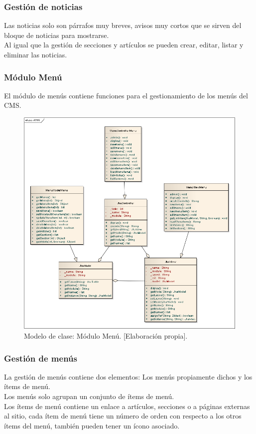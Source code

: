 \subsubsection{Gesti\'on de noticias}
Las noticias solo son p\'arrafos muy breves, avisos muy cortos que se sirven del bloque de noticias para mostrarse.\\
Al igual que la gesti\'on de secciones y art\'iculos se pueden crear, editar, listar y eliminar las noticias.

\newpage
\subsubsection{M\'odulo Men\'u}
El m\'odulo de men\'us contiene funciones para el gestionamiento de los men\'us del CMS.

\begin{figure}[h]
\centering
\includegraphics[scale=.4, keepaspectratio=true]{imagenes/15_imagen.png}
\caption{Modelo de clase: M\'odulo Men\'u. [Elaboraci\'on propia].}
\end{figure}

\subsubsection{Gesti\'on de men\'us}
La gesti\'on de men\'us contiene dos elementos: Los men\'us propiamente dichos y los \'items de men\'u.\\
Los men\'us solo agrupan un conjunto de \'items de men\'u.\\
Los \'items de men\'u contiene un enlace a art\'iculos, secciones o a p\'aginas externas al sitio, cada \'item de men\'u tiene un n\'umero de orden con respecto a los otros \'items del men\'u, tambi\'en pueden tener un \'icono asociado.

